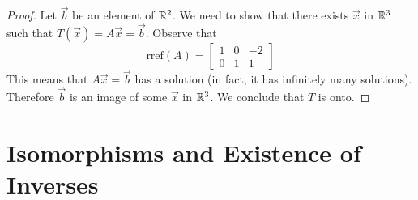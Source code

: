 \documentclass{ximera}
\begin{document}
\begin{example}
\begin{proof}

Let $\vec{b}$ be an element of $\mathbb{R}^2$.  We need to show that there exists $\vec{x}$ in $\mathbb{R}^3$ such that $T(\vec{x})=A\vec{x}=\vec{b}$. 
Observe that
 $$\text{rref}(A)=\begin{bmatrix}1 & 0 & -2\\0 & 1 & 1\end{bmatrix}$$
 This means that $A\vec{x}=\vec{b}$ has a solution (in fact, it has infinitely many solutions).  Therefore $\vec{b}$ is an image of some $\vec{x}$ in $\mathbb{R}^3$. We conclude that $T$ is onto. 
 


\end{proof}
\end{example}

\section*{Isomorphisms and Existence of Inverses}
\end{document}
